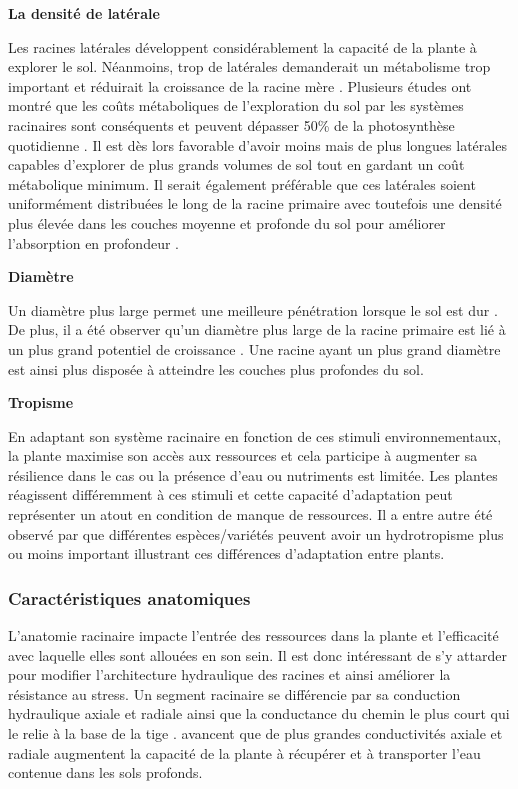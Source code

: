 \noindent \textbf{La densité de latérale}

Les racines latérales développent considérablement la capacité de la plante à explorer le sol.
Néanmoins, trop de latérales demanderait un métabolisme trop important et réduirait la croissance de la racine mère \citep{lynch_root_2014}.
Plusieurs études ont montré que les coûts métaboliques de l'exploration du sol par les systèmes racinaires sont conséquents et peuvent dépasser 50\% de la photosynthèse quotidienne \citep{kafkafi_respiratory_2002}.
Il est dès lors favorable d'avoir moins mais de plus longues latérales capables d'explorer de plus grands volumes de sol tout en gardant un coût métabolique minimum.
Il serait également préférable que ces latérales soient uniformément distribuées le long de la racine primaire avec toutefois une densité plus élevée dans les couches moyenne et profonde du sol pour améliorer l'absorption en profondeur \citep{wasson_traits_2012}.
\newline

\noindent \textbf{Diamètre}

Un diamètre plus large permet une meilleure pénétration lorsque le sol est dur \citep{bengough_root_2011}.
De plus, il a été observer qu'un diamètre plus large de la racine primaire est lié à un plus grand potentiel de croissance \citep{pages_estimating_2010}.
Une racine ayant un plus grand diamètre est ainsi plus disposée à atteindre les couches plus profondes du sol.
\newline

\noindent \textbf{Tropisme}

En adaptant son système racinaire en fonction de ces stimuli environnementaux, la plante maximise son accès aux ressources et cela participe à augmenter sa résilience dans le cas ou la présence d'eau ou nutriments est limitée.
Les plantes réagissent différemment à ces stimuli et cette capacité d'adaptation peut représenter un atout en condition de manque de ressources.
Il a entre autre été observé par \cite{gul_hydrotropism_2023} que différentes espèces/variétés peuvent avoir un hydrotropisme plus ou moins important illustrant ces différences d'adaptation entre plants.

\subsubsection{Caractéristiques anatomiques}

L'anatomie racinaire impacte l'entrée des ressources dans la plante et l'efficacité avec laquelle elles sont allouées en son sein.
Il est donc intéressant de s'y attarder pour modifier l'architecture hydraulique des racines et ainsi améliorer la résistance au stress.
Un segment racinaire se différencie par sa conduction hydraulique axiale et radiale ainsi que la conductance du chemin le plus court qui le relie à la base de la tige \citep{lobet_plant_2014}.
\citep{wasson_traits_2012} avancent que de plus grandes conductivités axiale et radiale augmentent la capacité de la plante à récupérer et à transporter l'eau contenue dans les sols profonds. 
\newline

